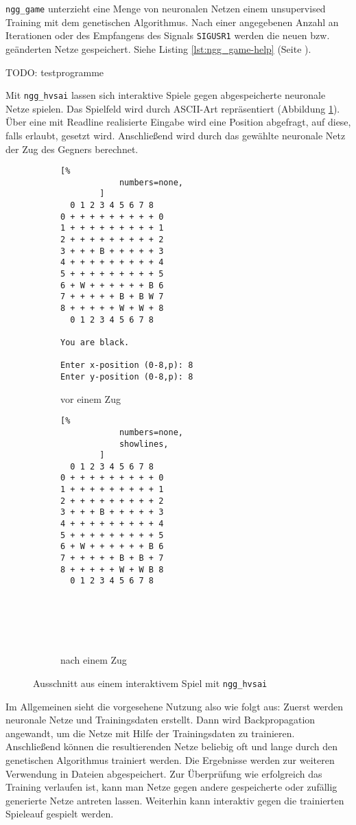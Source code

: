 \texttt{ngg\_game} unterzieht eine Menge von neuronalen Netzen einem
unsupervised Training mit dem genetischen Algorithmus. Nach einer angegebenen
Anzahl an Iterationen oder des Empfangens des Signals \texttt{SIGUSR1} werden
die neuen bzw. geänderten Netze gespeichert.
Siehe Listing \ref{lst:ngg_game-help} (Seite \pageref{lst:ngg_game-help}).

TODO: testprogramme

Mit \texttt{ngg\_hvsai} lassen sich interaktive Spiele gegen abgespeicherte
neuronale Netze spielen. Das Spielfeld wird durch ASCII-Art repräsentiert
(Abbildung \ref{fig:ngg_hvsai}). Über eine mit Readline \cite{readline}
realisierte Eingabe wird eine Position abgefragt, auf diese, falls erlaubt,
gesetzt wird. Anschließend wird durch das gewählte neuronale Netz der Zug des
Gegners berechnet.

\begin{figure}
    \centering

    \begin{subfigure}[t]{0.45\textwidth}
        \begin{lstlisting}[%
            numbers=none,
        ]
  0 1 2 3 4 5 6 7 8 
0 + + + + + + + + + 0
1 + + + + + + + + + 1
2 + + + + + + + + + 2
3 + + + B + + + + + 3
4 + + + + + + + + + 4
5 + + + + + + + + + 5
6 + W + + + + + + B 6
7 + + + + + B + B W 7
8 + + + + + W + W + 8
  0 1 2 3 4 5 6 7 8 

You are black.

Enter x-position (0-8,p): 8
Enter y-position (0-8,p): 8
        \end{lstlisting}
        \caption{vor einem Zug}
    \end{subfigure}
    \quad
    \begin{subfigure}[t]{0.35\textwidth}
        \begin{lstlisting}[%
            numbers=none,
            showlines,
        ]
  0 1 2 3 4 5 6 7 8 
0 + + + + + + + + + 0
1 + + + + + + + + + 1
2 + + + + + + + + + 2
3 + + + B + + + + + 3
4 + + + + + + + + + 4
5 + + + + + + + + + 5
6 + W + + + + + + B 6
7 + + + + + B + B + 7
8 + + + + + W + W B 8
  0 1 2 3 4 5 6 7 8 




 
        \end{lstlisting}
        \caption{nach einem Zug}
    \end{subfigure}
    \caption{Ausschnitt aus einem interaktivem Spiel mit \texttt{ngg\_hvsai}}
    \label{fig:ngg_hvsai}
 \end{figure}

Im Allgemeinen sieht die vorgesehene Nutzung also wie folgt aus: Zuerst werden
neuronale Netze und Trainingsdaten erstellt.  Dann wird Backpropagation
angewandt, um die Netze mit Hilfe der Trainingsdaten zu trainieren.
Anschließend können die resultierenden Netze beliebig oft und lange durch den
genetischen Algorithmus trainiert werden. Die Ergebnisse werden zur weiteren
Verwendung in Dateien abgespeichert.
Zur Überprüfung wie erfolgreich das Training verlaufen ist, kann man Netze
gegen andere gespeicherte oder zufällig generierte Netze antreten lassen.
Weiterhin kann interaktiv gegen die trainierten Spieleauf gespielt werden.
